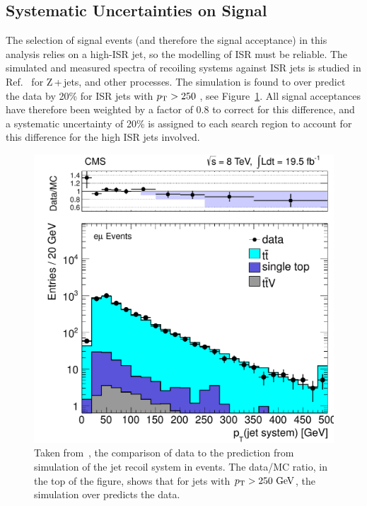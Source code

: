 \subsection{Systematic Uncertainties on Signal}
\label{sec:signalSYST}


The selection of signal events (and therefore the signal acceptance) in this analysis relies on a high-\pt ISR jet, so the modelling of ISR must be reliable.
The simulated and measured \pt spectra of recoiling systems against ISR jets is studied in Ref.~\cite{CMSsinglelep} for Z\,+\,jets, 
\ttbar and other processes. 
The simulation is found to over predict the data by 20\% for ISR jets with $p_{\text{T}} > 250$ \GeV, see Figure~\ref{fig:ISRsyst}.
All signal acceptances have therefore been weighted by a factor of 0.8 to correct for this difference, and a systematic uncertainty of 20\% is assigned to each search region to account for this difference for the high \pt ISR jets involved.

\begin{figure}[ht!]
  \begin{center}
  \includegraphics[scale=0.35]{Figures/sus13009/ISRmodellingSUS13011.pdf}
  \caption{Taken from~\cite{CMSsinglelep}, the comparison of data to the prediction from simulation of the jet recoil system in \ttbar events. The data/MC ratio, in the top of the figure, shows that for jets with $p_{\text{T}}>250~\mathrm{GeV}$, the simulation over predicts the data.
\label{fig:ISRsyst}}
  \end{center}
\end{figure}


